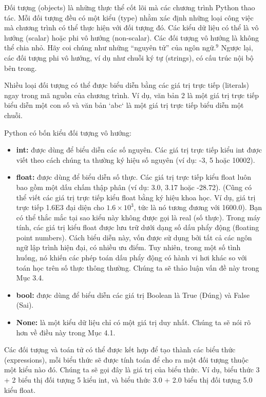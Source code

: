 \noindent \indent Đối tượng (objects) là những thực thể cốt lõi mà các chương trình Python thao tác. Mỗi đối tượng đều có một kiểu (type) nhằm xác định những loại công việc mà chương trình có thể thực hiện với đối tượng đó. Các kiểu dữ liệu có thể là vô hướng (scalar) hoặc phi vô hướng (non-scalar). Các đối tượng vô hướng là không thể chia nhỏ. Hãy coi chúng như những ``nguyên tử'' của ngôn ngữ.$^9$ Ngược lại, các đối tượng phi vô hướng, ví dụ như chuỗi ký tự (strings), có cấu trúc nội bộ bên trong.

Nhiều loại đối tượng có thể được biểu diễn bằng các giá trị trực tiếp (literals) ngay trong mã nguồn của chương trình. Ví dụ, văn bản 2 là một giá trị trực tiếp biểu diễn một con số và văn bản `abc` là một giá trị trực tiếp biểu diễn một chuỗi.

Python có bốn kiểu đối tượng vô hướng:

\begin{itemize}
    \item \textbf{int:} được dùng để biểu diễn các số nguyên. Các giá trị trực tiếp kiểu int được viết theo cách chúng ta thường ký hiệu số nguyên (ví dụ: -3, 5 hoặc 10002).
    
    \item \textbf{float:} được dùng để biểu diễn số thực. Các giá trị trực tiếp kiểu float luôn bao gồm một dấu chấm thập phân (ví dụ: 3.0, 3.17 hoặc -28.72). (Cũng có thể viết các giá trị trực tiếp kiểu float bằng ký hiệu khoa học. Ví dụ, giá trị trực tiếp 1.6E3 đại diện cho $1.6 \times 10^3$, tức là nó tương đương với 1600.0). Bạn có thể thắc mắc tại sao kiểu này không được gọi là real (số thực). Trong máy tính, các giá trị kiểu float được lưu trữ dưới dạng số dấu phẩy động (floating point numbers). Cách biểu diễn này, vốn được sử dụng bởi tất cả các ngôn ngữ lập trình hiện đại, có nhiều ưu điểm. Tuy nhiên, trong một số tình huống, nó khiến các phép toán dấu phẩy động có hành vi hơi khác so với toán học trên số thực thông thường. Chúng ta sẽ thảo luận vấn đề này trong Mục 3.4.
    
    \item \textbf{bool:} được dùng để biểu diễn các giá trị Boolean là True (Đúng) và False (Sai).
    
    \item \textbf{None:} là một kiểu dữ liệu chỉ có một giá trị duy nhất. Chúng ta sẽ nói rõ hơn về điều này trong Mục 4.1.
\end{itemize}

Các đối tượng và toán tử có thể được kết hợp để tạo thành các biểu thức (expressions), mỗi biểu thức sẽ được tính toán để cho ra một đối tượng thuộc một kiểu nào đó. Chúng ta sẽ gọi đây là giá trị của biểu thức. Ví dụ, biểu thức 3 + 2 biểu thị đối tượng 5 kiểu int, và biểu thức 3.0 + 2.0 biểu thị đối tượng 5.0 kiểu float.

